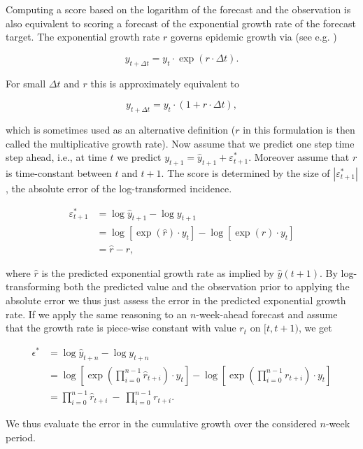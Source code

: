 \documentclass{article}
\begin{document}
Computing a score based on the logarithm of the forecast and the observation is also equivalent to scoring a forecast of the exponential growth rate of the forecast target. The exponential growth rate $r$ governs epidemic growth via (see e.g. \cite{wallingaHowGenerationIntervals2007})
%
\begin{linenomath*}
\begin{equation*}
y_{t + \Delta t} = y_t \cdot \exp(r \cdot \Delta t).
\end{equation*}
\end{linenomath*}
For small $\Delta t$ and $r$ this is approximately equivalent to
\begin{linenomath*}
\begin{equation*}
 y_{t + \Delta t} = y_t \cdot (1 + r \cdot \Delta t),
\end{equation*}
\end{linenomath*}
%
which is sometimes used as an alternative definition ($r$ in this formulation is then called the multiplicative growth rate). Now assume that we predict one step time step ahead, i.e., at time $t$ we predict $y_{t + 1} = \hat{y}_{t + 1} + \varepsilon^*_{t+1}$. Moreover assume that $r$ is time-constant between $t$ and $t + 1$. The score is determined by the size of $\left|\varepsilon^*_{t+1}\right|$, the absolute error of the log-transformed incidence. 
%
\begin{linenomath*}
\begin{align*}
\varepsilon^*_{t+1} & = \log \hat{y}_{t + 1} - \log y_{t + 1} \\
& = \log \left[\exp(\hat{r}) \cdot y_t\right] - \log \left[\exp(r) \cdot y_t\right] \\
& = \hat{r} - r,
\end{align*}
\end{linenomath*}
where $\hat{r}$ is the predicted exponential growth rate as implied by $\hat{y}(t + 1)$. By log-transforming both the predicted value and the observation prior to applying the absolute error we thus just assess the error in the predicted exponential growth rate. If we apply the same reasoning to an $n$-week-ahead forecast and assume that the growth rate is piece-wise constant with value $r_t$ on $[t, t + 1)$, we get
%
\begin{linenomath*}
\begin{align*}
\epsilon^* & = \log \hat{y}_{t + n} - \log y_{t + n}\\
& = \log\left[\exp\left(\prod_{i = 0}^{n - 1}\hat{r}_{t + i}\right) \cdot y_t\right] - \log\left[\exp\left(\prod_{i = 0}^{n - 1}r_{t + i} \right) \cdot y_t\right]\\
& =   \prod_{i = 0}^{n - 1}\hat{r}_{t + i} \ - \ \prod_{i = 0}^{n - 1}r_{t + i}.
\end{align*}
\end{linenomath*}
We thus evaluate the error in the cumulative growth over the considered $n$-week period.
\end{document}
